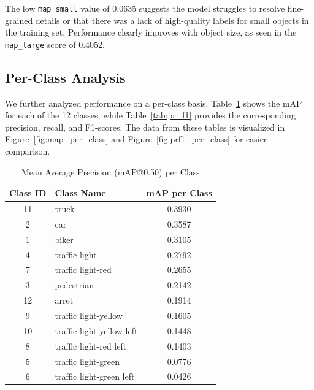 \documentclass[10pt, conference]{IEEEtran}
\begin{document}
The low \texttt{map\_small} value of 0.0635 suggests the model struggles to resolve fine-grained details or that there was a lack of high-quality labels for small objects in the training set. Performance clearly improves with object size, as seen in the \texttt{map\_large} score of 0.4052.

\subsection{Per-Class Analysis}
We further analyzed performance on a per-class basis. Table~\ref{tab:map_class} shows the mAP for each of the 12 classes, while Table~\ref{tab:pr_f1} provides the corresponding precision, recall, and F1-scores. The data from these tables is visualized in Figure~\ref{fig:map_per_class} and Figure~\ref{fig:prf1_per_class} for easier comparison.

\begin{table}[h!]
\centering
\caption{Mean Average Precision (mAP@0.50) per Class}
\label{tab:map_class}
\begin{tabular}{@{}clc@{}}
\toprule
\textbf{Class ID} & \textbf{Class Name} & \textbf{mAP per Class} \\ \midrule
11 & truck & 0.3930 \\
2 & car & 0.3587 \\
1 & biker & 0.3105 \\
4 & traffic light & 0.2792 \\
7 & traffic light-red & 0.2655 \\
3 & pedestrian & 0.2142 \\
12 & arret & 0.1914 \\
9 & traffic light-yellow & 0.1605 \\
10 & traffic light-yellow left & 0.1448 \\
8 & traffic light-red left & 0.1403 \\
5 & traffic light-green & 0.0776 \\
6 & traffic light-green left & 0.0426 \\ \bottomrule
\end{tabular}
\end{table}
\end{document}
